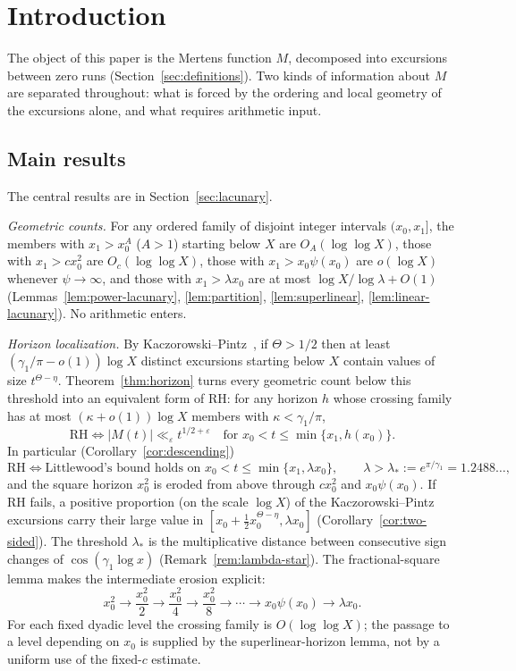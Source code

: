 \documentclass[11pt]{amsart}
\numberwithin{equation}{section}
\theoremstyle{plain}
\theoremstyle{definition}
\theoremstyle{remark}
\newcommand{\eps}{\varepsilon}
\begin{document}
\tableofcontents

\section{Introduction}
\label{sec:introduction}

The object of this paper is the Mertens function $M$, decomposed into
excursions between zero runs (Section~\ref{sec:definitions}). Two kinds of
information about $M$ are separated throughout: what is forced by the
ordering and local geometry of the excursions alone, and what requires
arithmetic input.

\subsection*{Main results}

The central results are in Section~\ref{sec:lacunary}.

\smallskip\noindent\emph{Geometric counts.} For any ordered family of
disjoint integer intervals $(x_{0},x_{1}]$, the members with $x_1>x_0^A$
($A>1$) starting below $X$ are $O_A(\log\log X)$, those with
$x_1>cx_0^2$ are $O_c(\log\log X)$, those with $x_1>x_0\psi(x_0)$ are
$o(\log X)$ whenever $\psi\to\infty$, and those with $x_1>\lambda x_0$ are at
most $\log X/\log\lambda+O(1)$ (Lemmas~\ref{lem:power-lacunary},
\ref{lem:partition}, \ref{lem:superlinear}, \ref{lem:linear-lacunary}). No
arithmetic enters.

\smallskip\noindent\emph{Horizon localization.} By
Kaczorowski--Pintz~\cite{KP86}, if $\Theta>1/2$ then at least
$(\gamma_1/\pi-o(1))\log X$ distinct excursions starting below $X$ contain
values of size $t^{\Theta-\eta}$. Theorem~\ref{thm:horizon} turns every
geometric count below this threshold into an equivalent form of RH: for any
horizon $h$ whose crossing family has at most $(\kappa+o(1))\log X$ members
with $\kappa<\gamma_1/\pi$,
\[
\mathrm{RH}\iff |M(t)|\ll_\eps t^{1/2+\eps}\quad\text{for }x_0<t\le\min\{x_1,h(x_0)\}.
\]
In particular (Corollary~\ref{cor:descending})
\[
\mathrm{RH}\iff\text{Littlewood's bound holds on }x_0<t\le\min\{x_1,\lambda x_0\},
\qquad\lambda>\lambda_*:=e^{\pi/\gamma_1}=1.2488\ldots,
\]
and the square horizon $x_0^2$ is eroded from above through $cx_0^2$ and
$x_0\psi(x_0)$. If RH fails, a positive proportion (on the scale $\log X$) of the
Kaczorowski--Pintz excursions carry their large value in
$[x_0+\frac12x_0^{\Theta-\eta},\lambda x_0]$ (Corollary~\ref{cor:two-sided}). The threshold $\lambda_*$ is the multiplicative distance
between consecutive sign changes of $\cos(\gamma_1\log x)$
(Remark~\ref{rem:lambda-star}).  The fractional-square lemma makes the
intermediate erosion explicit:
\[
x_0^2\longrightarrow \frac{x_0^2}{2}\longrightarrow
\frac{x_0^2}{4}\longrightarrow\frac{x_0^2}{8}\longrightarrow\cdots
\longrightarrow x_0\psi(x_0)\longrightarrow\lambda x_0.
\]
For each fixed dyadic level the crossing family is $O(\log\log X)$; the
passage to a level depending on $x_0$ is supplied by the superlinear-horizon
lemma, not by a uniform use of the fixed-$c$ estimate.
\end{document}
